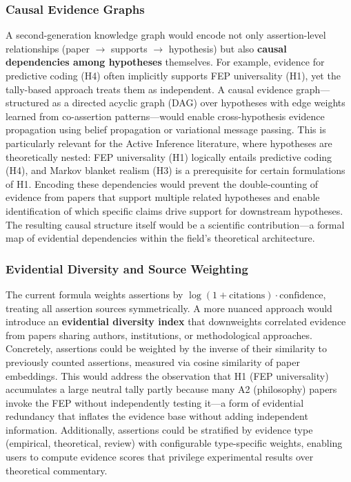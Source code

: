 \documentclass[
  english,
]{article}
\begin{document}
{{{{{{{{{{{{{{{{\subsubsection{Causal Evidence Graphs}\label{causal-evidence-graphs}

A second-generation knowledge graph would encode not only
assertion-level relationships (paper \texorpdfstring{\ensuremath{\to}}{->} supports \texorpdfstring{\ensuremath{\to}}{->} hypothesis) but also
\textbf{causal dependencies among hypotheses} themselves. For example,
evidence for predictive coding (H4) often implicitly supports FEP
universality (H1), yet the tally-based approach treats them as
independent. A causal evidence graph---structured as a directed acyclic
graph (DAG) over hypotheses with edge weights learned from co-assertion
patterns---would enable cross-hypothesis evidence propagation using
belief propagation or variational message passing. This is particularly
relevant for the Active Inference literature, where hypotheses are
theoretically nested: FEP universality (H1) logically entails predictive
coding (H4), and Markov blanket realism (H3) is a prerequisite for
certain formulations of H1. Encoding these dependencies would prevent
the double-counting of evidence from papers that support multiple
related hypotheses and enable identification of which specific claims
drive support for downstream hypotheses. The resulting causal structure
itself would be a scientific contribution---a formal map of evidential
dependencies within the field's theoretical architecture.

\subsubsection{Evidential Diversity and Source
Weighting}\label{evidential-diversity-and-source-weighting}

The current formula weights assertions by
\(\log(1 + \text{citations}) \cdot \text{confidence}\), treating all
assertion sources symmetrically. A more nuanced approach would introduce
an \textbf{evidential diversity index} that downweights correlated
evidence from papers sharing authors, institutions, or methodological
approaches. Concretely, assertions could be weighted by the inverse of
their similarity to previously counted assertions, measured via cosine
similarity of paper embeddings. This would address the observation that
H1 (FEP universality) accumulates a large neutral tally partly because
many A2 (philosophy) papers invoke the FEP without independently testing
it---a form of evidential redundancy that inflates the evidence base
without adding independent information. Additionally, assertions could
be stratified by evidence type (empirical, theoretical, review) with
configurable type-specific weights, enabling users to compute evidence
scores that privilege experimental results over theoretical commentary.

}}}}}}}}}}}}}}}}
\end{document}

